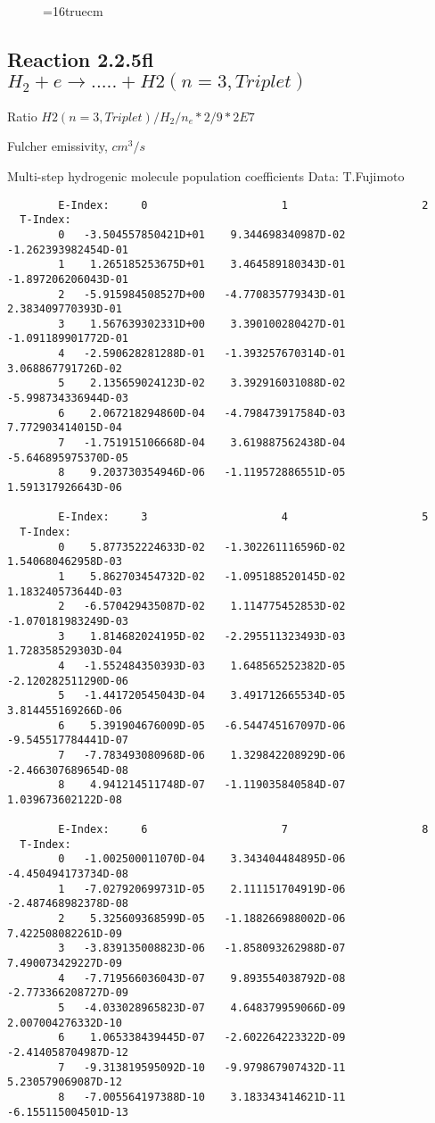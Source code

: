 \documentclass[12pt]{article}
\begin{document}
\begin{figure} \label{2.2.5e}
\epsfxsize=16truecm
\end{figure}

\newpage
\subsection{
Reaction 2.2.5fl $H_2 + e \rightarrow .....+H2(n=3,Triplet)$}

Ratio $H2(n=3, Triplet)/H_2/n_e*2/9*2E7 $

 Fulcher emissivity, $cm^3/s$

 Multi-step hydrogenic molecule population coefficients
 Data: T.Fujimoto

\begin{small}\begin{verbatim}
        E-Index:     0                     1                     2
  T-Index:
        0   -3.504557850421D+01    9.344698340987D-02   -1.262393982454D-01
        1    1.265185253675D+01    3.464589180343D-01   -1.897206206043D-01
        2   -5.915984508527D+00   -4.770835779343D-01    2.383409770393D-01
        3    1.567639302331D+00    3.390100280427D-01   -1.091189901772D-01
        4   -2.590628281288D-01   -1.393257670314D-01    3.068867791726D-02
        5    2.135659024123D-02    3.392916031088D-02   -5.998734336944D-03
        6    2.067218294860D-04   -4.798473917584D-03    7.772903414015D-04
        7   -1.751915106668D-04    3.619887562438D-04   -5.646895975370D-05
        8    9.203730354946D-06   -1.119572886551D-05    1.591317926643D-06

        E-Index:     3                     4                     5
  T-Index:
        0    5.877352224633D-02   -1.302261116596D-02    1.540680462958D-03
        1    5.862703454732D-02   -1.095188520145D-02    1.183240573644D-03
        2   -6.570429435087D-02    1.114775452853D-02   -1.070181983249D-03
        3    1.814682024195D-02   -2.295511323493D-03    1.728358529303D-04
        4   -1.552484350393D-03    1.648565252382D-05   -2.120282511290D-06
        5   -1.441720545043D-04    3.491712665534D-05    3.814455169266D-06
        6    5.391904676009D-05   -6.544745167097D-06   -9.545517784441D-07
        7   -7.783493080968D-06    1.329842208929D-06   -2.466307689654D-08
        8    4.941214511748D-07   -1.119035840584D-07    1.039673602122D-08

        E-Index:     6                     7                     8
  T-Index:
        0   -1.002500011070D-04    3.343404484895D-06   -4.450494173734D-08
        1   -7.027920699731D-05    2.111151704919D-06   -2.487468982378D-08
        2    5.325609368599D-05   -1.188266988002D-06    7.422508082261D-09
        3   -3.839135008823D-06   -1.858093262988D-07    7.490073429227D-09
        4   -7.719566036043D-07    9.893554038792D-08   -2.773366208727D-09
        5   -4.033028965823D-07    4.648379959066D-09    2.007004276332D-10
        6    1.065338439445D-07   -2.602264223322D-09   -2.414058704987D-12
        7   -9.313819595092D-10   -9.979867907432D-11    5.230579069087D-12
        8   -7.005564197388D-10    3.183343414621D-11   -6.155115004501D-13


\end{verbatim}
\end{small}
\end{document}
